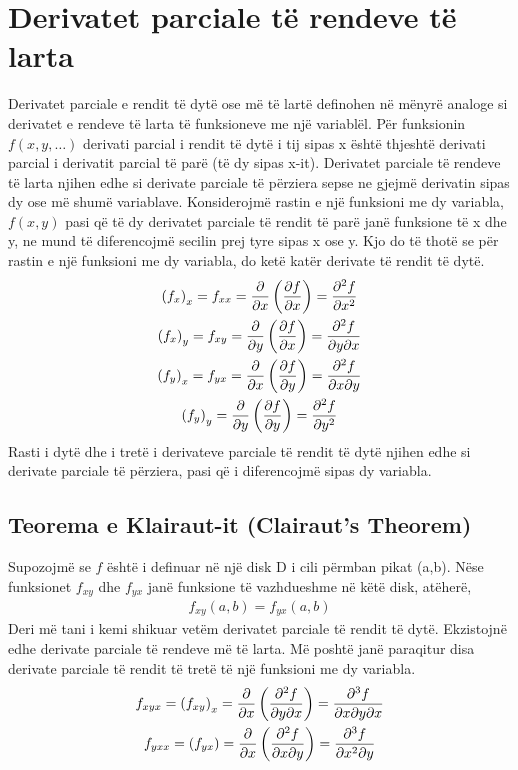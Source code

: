 \documentclass[a4paper]{article}
\begin{document}
\section{Derivatet parciale të rendeve të larta}
Derivatet parciale e rendit të dytë ose më të lartë definohen në mënyrë analoge si derivatet e rendeve të larta të funksioneve me një variablël. Për funksionin $f(x,y,\ldots)$ derivati parcial i rendit të dytë i tij sipas x është thjeshtë derivati parcial i derivatit parcial të parë (të dy sipas x-it). Derivatet parciale të rendeve të larta njihen edhe si derivate parciale të përziera sepse ne gjejmë derivatin sipas dy ose më shumë variablave.
Konsiderojmë rastin e një funksioni me dy variabla, $f(x,y)$ pasi që të dy derivatet parciale të rendit të parë janë funksione të x dhe y, ne mund të diferencojmë secilin prej tyre sipas x ose y. Kjo do të thotë se për rastin e një funksioni me dy variabla, do ketë katër derivate të rendit të dytë.
\begin{gather*}
	\left( f_x \right)_x = f_{x x} = \pdv{}{x}\left( \pdv{f}{x} \right)= \pdv[2]{f}{x}\\
	\left( f_x \right)_y = f_{x y} = \pdv{}{y}\left( \pdv{f}{x} \right) = \pdv{f}{y}{x}\\
	\left( f_y \right)_x = f_{y x} = \pdv{}{x}\left( \pdv{f}{y} \right) = \pdv{f}{x}{y}\\
	\left( f_y \right)_y = \pdv{}{y}\left( \pdv{f}{y} \right) = \pdv[2]{f}{y}
\end{gather*}
Rasti i dytë dhe i tretë i derivateve parciale të rendit të dytë njihen edhe si derivate parciale të përziera, pasi që i diferencojmë sipas dy variabla.
\newpage

\subsection{Teorema e Klairaut-it (Clairaut's Theorem)}
Supozojmë se $f$ është i definuar në një disk D i cili përmban pikat (a,b). Nëse funksionet $f_{x y}$ dhe $f_{y x}$ janë funksione të vazhdueshme në këtë disk, atëherë,
\begin{align*}
	f_{x y}(a,b) = f_{y x}(a,b)
\end{align*}
Deri më tani i kemi shikuar vetëm derivatet parciale të rendit të dytë. Ekzistojnë edhe derivate parciale të rendeve më të larta. Më poshtë janë paraqitur disa derivate parciale të rendit të tretë të një funksioni me dy variabla.
\begin{gather*}
	f_{x y x} = \left( f_{x y} \right)_x = \pdv{}{x}\left( \pdv[2]{f}{y}{x} \right) = \frac{\partial^3 f}{\partial{x}\partial{y}\partial{x}}\\
	f_{y x x} = \left( f_{y x} \right) = \pdv{}{x}\left( \pdv[2]{f}{x}{y} \right) = \frac{\partial^3{f}}{\partial{x^2}\partial{y}}
\end{gather*}
\end{document}
